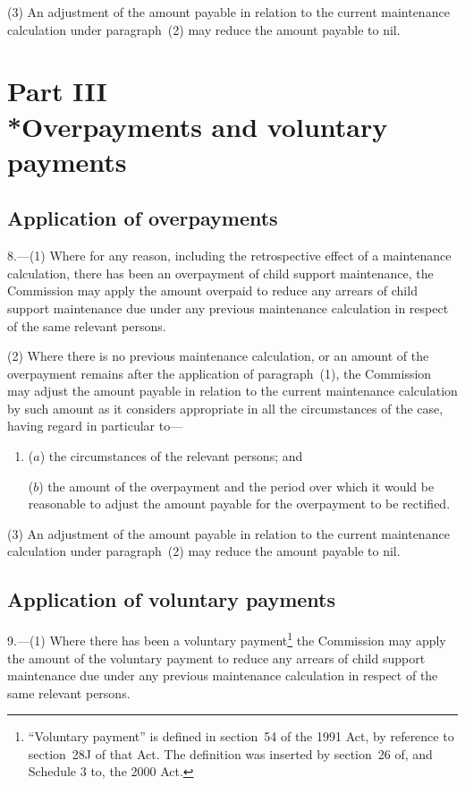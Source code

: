 \documentclass[12pt,a4paper]{article}
\begin{document}
(3) An adjustment of the amount payable in relation to the current maintenance calculation under paragraph~(2) may reduce the amount payable to nil.

\section[Part III --- Overpayments and voluntary payments]{Part III\\*Overpayments and voluntary payments}

\renewcommand\parthead{--- Part III}

\subsection[8. Application of overpayments]{Application of overpayments}

8.---(1)  Where for any reason, including the retrospective effect of a maintenance calculation, there has been an overpayment of child support maintenance, the Commission may apply the amount overpaid to reduce any arrears of child support maintenance due under any previous maintenance calculation in respect of the same relevant persons.

(2) Where there is no previous maintenance calculation, or an amount of the overpayment remains after the application of paragraph~(1), the Commission may adjust the amount payable in relation to the current maintenance calculation by such amount as it considers appropriate in all the circumstances of the case, having regard in particular to—
\begin{enumerate}\item[]
($a$) the circumstances of the relevant persons; and

($b$) the amount of the overpayment and the period over which it would be reasonable to adjust the amount payable for the overpayment to be rectified.
\end{enumerate}

(3) An adjustment of the amount payable in relation to the current maintenance calculation under paragraph~(2) may reduce the amount payable to nil.

\subsection[9. Application of voluntary payments]{Application of voluntary payments}

9.---(1)  Where there has been a voluntary payment\footnote{“Voluntary payment” is defined in section~54 of the 1991 Act, by reference to section~28J of that Act. The definition was inserted by section~26 of, and Schedule 3 to, the 2000 Act.} the Commission may apply the amount of the voluntary payment to reduce any arrears of child support maintenance due under any previous maintenance calculation in respect of the same relevant persons.
\end{document}
